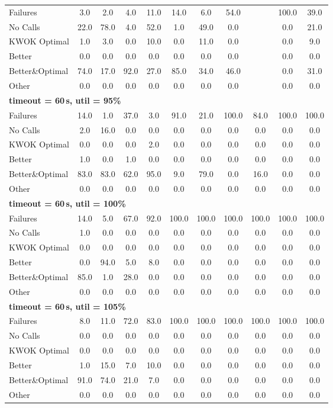 \begin{tabular}{l cccccccccc}
\midrule
Failures & 3.0 & 2.0 & 4.0 & 11.0 & 14.0 & 6.0 & 54.0 & \text{--} & 100.0 & 39.0 \\
No Calls & 22.0 & 78.0 & 4.0 & 52.0 & 1.0 & 49.0 & 0.0 & \text{--} & 0.0 & 21.0 \\
KWOK Optimal & 1.0 & 3.0 & 0.0 & 10.0 & 0.0 & 11.0 & 0.0 & \text{--} & 0.0 & 9.0 \\
Better & 0.0 & 0.0 & 0.0 & 0.0 & 0.0 & 0.0 & 0.0 & \text{--} & 0.0 & 0.0 \\
Better\&Optimal & 74.0 & 17.0 & 92.0 & 27.0 & 85.0 & 34.0 & 46.0 & \text{--} & 0.0 & 31.0 \\
Other & 0.0 & 0.0 & 0.0 & 0.0 & 0.0 & 0.0 & 0.0 & \text{--} & 0.0 & 0.0 \\
\midrule
\multicolumn{11}{l}{\textbf{timeout = 60\,s, util = 95\%}} \\
\midrule
Failures & 14.0 & 1.0 & 37.0 & 3.0 & 91.0 & 21.0 & 100.0 & 84.0 & 100.0 & 100.0 \\
No Calls & 2.0 & 16.0 & 0.0 & 0.0 & 0.0 & 0.0 & 0.0 & 0.0 & 0.0 & 0.0 \\
KWOK Optimal & 0.0 & 0.0 & 0.0 & 2.0 & 0.0 & 0.0 & 0.0 & 0.0 & 0.0 & 0.0 \\
Better & 1.0 & 0.0 & 1.0 & 0.0 & 0.0 & 0.0 & 0.0 & 0.0 & 0.0 & 0.0 \\
Better\&Optimal & 83.0 & 83.0 & 62.0 & 95.0 & 9.0 & 79.0 & 0.0 & 16.0 & 0.0 & 0.0 \\
Other & 0.0 & 0.0 & 0.0 & 0.0 & 0.0 & 0.0 & 0.0 & 0.0 & 0.0 & 0.0 \\
\midrule
\multicolumn{11}{l}{\textbf{timeout = 60\,s, util = 100\%}} \\
\midrule
Failures & 14.0 & 5.0 & 67.0 & 92.0 & 100.0 & 100.0 & 100.0 & 100.0 & 100.0 & 100.0 \\
No Calls & 1.0 & 0.0 & 0.0 & 0.0 & 0.0 & 0.0 & 0.0 & 0.0 & 0.0 & 0.0 \\
KWOK Optimal & 0.0 & 0.0 & 0.0 & 0.0 & 0.0 & 0.0 & 0.0 & 0.0 & 0.0 & 0.0 \\
Better & 0.0 & 94.0 & 5.0 & 8.0 & 0.0 & 0.0 & 0.0 & 0.0 & 0.0 & 0.0 \\
Better\&Optimal & 85.0 & 1.0 & 28.0 & 0.0 & 0.0 & 0.0 & 0.0 & 0.0 & 0.0 & 0.0 \\
Other & 0.0 & 0.0 & 0.0 & 0.0 & 0.0 & 0.0 & 0.0 & 0.0 & 0.0 & 0.0 \\
\midrule
\multicolumn{11}{l}{\textbf{timeout = 60\,s, util = 105\%}} \\
\midrule
Failures & 8.0 & 11.0 & 72.0 & 83.0 & 100.0 & 100.0 & 100.0 & 100.0 & 100.0 & 100.0 \\
No Calls & 0.0 & 0.0 & 0.0 & 0.0 & 0.0 & 0.0 & 0.0 & 0.0 & 0.0 & 0.0 \\
KWOK Optimal & 0.0 & 0.0 & 0.0 & 0.0 & 0.0 & 0.0 & 0.0 & 0.0 & 0.0 & 0.0 \\
Better & 1.0 & 15.0 & 7.0 & 10.0 & 0.0 & 0.0 & 0.0 & 0.0 & 0.0 & 0.0 \\
Better\&Optimal & 91.0 & 74.0 & 21.0 & 7.0 & 0.0 & 0.0 & 0.0 & 0.0 & 0.0 & 0.0 \\
Other & 0.0 & 0.0 & 0.0 & 0.0 & 0.0 & 0.0 & 0.0 & 0.0 & 0.0 & 0.0 \\
\bottomrule
\end{tabular}
